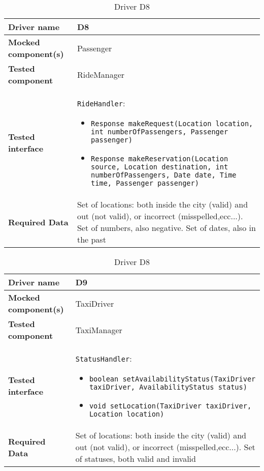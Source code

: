 \begin{table}[H]
	\begin{tabular}{ l | p{} }
		\textbf{Driver name} & D8\label{D8} \\ \hline
		\textbf{Mocked component(s)} & Passenger \\ \hline
		\textbf{Tested component} & RideManager \\ \hline
		\textbf{Tested interface} & \texttt{RideHandler}:
		\begin{itemize}
			\item \texttt{Response makeRequest(Location location, int numberOfPassengers, Passenger passenger)}
			\item \texttt{Response makeReservation(Location source, Location destination, int numberOfPassengers, Date date, Time time, Passenger passenger)}
		\end{itemize} \\ \hline
		\textbf{Required Data} & Set of locations: both inside the city (valid) and out (not valid), or incorrect (misspelled,ecc...). Set of numbers, also negative. Set of dates, also in the past
	\end{tabular}
	\caption{Driver D8}
\end{table}

\begin{table}[H]
	\begin{tabular}{ l | p{} }
		\textbf{Driver name} & D9\label{D9} \\ \hline
		\textbf{Mocked component(s)} & TaxiDriver \\ \hline
		\textbf{Tested component} & TaxiManager \\ \hline
		\textbf{Tested interface} & \texttt{StatusHandler}:
		\begin{itemize}
			\item \texttt{boolean setAvailabilityStatus(TaxiDriver taxiDriver, AvailabilityStatus status)}
			\item \texttt{void setLocation(TaxiDriver taxiDriver, Location location)}
		\end{itemize} \\ \hline
		\textbf{Required Data} & Set of locations: both inside the city (valid) and out (not valid), or incorrect (misspelled,ecc...). Set of statuses, both valid and invalid
	\end{tabular}
	\caption{Driver D8}
\end{table}